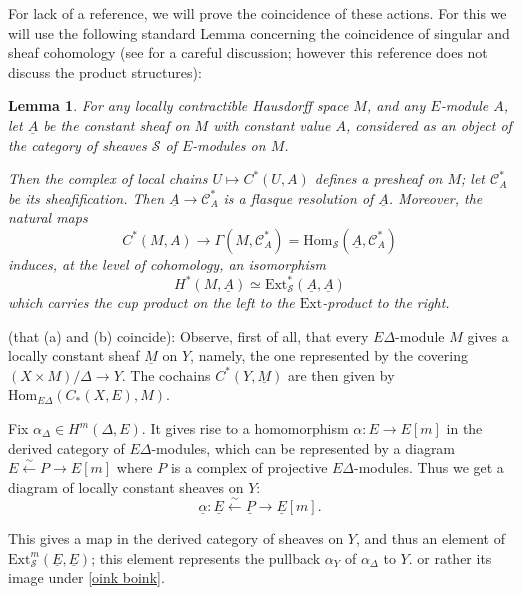 \documentclass[10pt]{amsart}
\newcommand{\Ext}{\mathrm{Ext}}
\newcommand{\Hom}{\mathrm{Hom}}
\newtheorem{lemma}[subsection]{Lemma}
\theoremstyle{remark}
\begin{document}
%
%
%
%
%
%
%
%
%
%
%
%
%
%
%
%
%
%
%
For lack of a reference, we will prove the coincidence of these actions. For this we will use the following standard Lemma
concerning the coincidence of singular and sheaf cohomology (see \cite{Sella} for a careful discussion; however this reference does not discuss the product structures): 
\begin{lemma} For any locally contractible Hausdorff space $M$,  and any $E$-module $A$, 
let $\underline{A}$
be the constant sheaf on $M$ with constant value $A$, considered
as an object of the category of sheaves $\mathcal{S}$ of $E$-modules on $M$. 

Then the complex of local chains $U \mapsto C^*(U, A)$ defines a presheaf on $M$;
let $\mathcal{C}^*_A$ be its sheafification.  Then $\underline{A} \rightarrow \mathcal{C}^*_A$ is a flasque resolution of $\underline{A}$. Moreover, the natural maps
$$ C^*(M, A) \rightarrow \Gamma(M, \mathcal{C}^*_A) = 
 \Hom_{\mathcal{S}}(\underline{A},  \mathcal{C}^*_A) $$ 
induces, at the level of cohomology, an isomorphism
\begin{equation} \label{oink boink} H^*(M, \underline{A}) \simeq   \Ext_{\mathcal{S}}^*(\underline{A}, \underline{A})\end{equation}
which carries the cup product on the left to the $\Ext$-product to the right. 
\end{lemma}
 
\proof (that (a) and (b) coincide): 
Observe, first of all,  that every $E\Delta$-module $M$ gives a locally constant sheaf $\underline{M}$ on $Y$, namely, the one represented by the covering $(X \times M)/\Delta \rightarrow Y$. 
The cochains $C^*(Y, \underline{M})$ are then given by $\Hom_{E \Delta}(C_*(X, E), M)$. 


 Fix   $\alpha_{\Delta} \in H^m(\Delta, E)$. It gives rise to a homomorphism $\alpha: E \rightarrow E[m]$ in the derived category of $E\Delta$-modules,
 which can be represented by  a diagram
$E \stackrel{\sim}{\leftarrow} P \rightarrow E[m]$ 
 where $P$ is a complex of projective $E\Delta$-modules.
 Thus we get 
a diagram of locally constant sheaves on $Y$:
 $$\underline{\alpha}: \underline{E}  \stackrel{\sim}{\leftarrow} \underline{P} \rightarrow \underline{E}[m].$$
 
 
 This gives a map in the derived category of sheaves on $Y$, and thus an element of $\Ext^m_{\mathcal{S}}(\underline{E}, \underline{E})$; this  element represents the pullback $\alpha_Y$ of $\alpha_{\Delta}$ to $Y$. %
 or rather its image under  \eqref{oink boink}.
 
\end{document}
